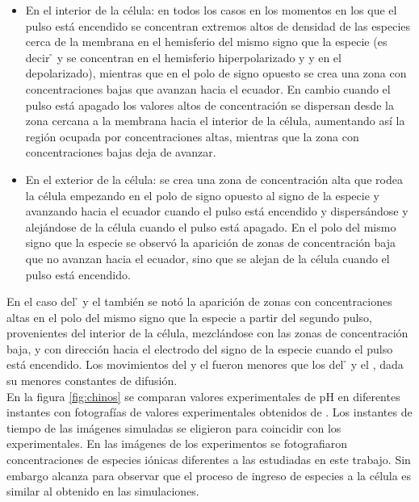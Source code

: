 \begin{itemize}
	\item En el interior de la célula: en todos los casos en los momentos en los que el pulso está encendido se concentran extremos altos de densidad de las especies cerca de la membrana en el hemisferio del mismo signo que la especie (es decir \h{} y \oh{} se concentran en el hemisferio hiperpolarizado y \na{} y \cl{} en el depolarizado), mientras que en el polo de signo opuesto se crea una zona con concentraciones bajas que avanzan hacia el ecuador. En cambio cuando el pulso está apagado los valores altos de concentración se dispersan desde la zona cercana a la membrana hacia el interior de la célula, aumentando así la región ocupada por concentraciones altas, mientras que la zona con concentraciones bajas deja de avanzar.

	\item En el exterior de la célula: se crea una zona de concentración alta que rodea la célula empezando en el polo de signo opuesto al signo de la especie y avanzando hacia el ecuador cuando el pulso está encendido y dispersándose y alejándose de la célula cuando el pulso está apagado. En el polo del mismo signo que la especie se observó la aparición de zonas de concentración baja que no avanzan hacia el ecuador, sino que se alejan de la célula cuando el pulso está encendido.
\end{itemize}

En el caso del \h{} y el \oh{} también se notó la aparición de zonas con concentraciones altas en el polo del mismo signo que la especie a partir del segundo pulso, provenientes del interior de la célula, mezclándose con las zonas de concentración baja, y con dirección hacia el electrodo del signo de la especie cuando el pulso está encendido. Los movimientos del \na{} y el \cl{} fueron menores que los del \h{} y el \oh, dada su menores constantes de difusión.\\

En la figura \ref{fig:chinos} se comparan valores experimentales de pH en diferentes instantes con fotografías de valores experimentales obtenidos de \cite{gt99}. Los instantes de tiempo de las imágenes simuladas se eligieron para coincidir con los experimentales. En las imágenes de los experimentos se fotografiaron concentraciones de especies iónicas diferentes a las estudiadas en este trabajo. Sin embargo alcanza para observar que el proceso de ingreso de especies a la célula es similar al obtenido en las simulaciones. 

